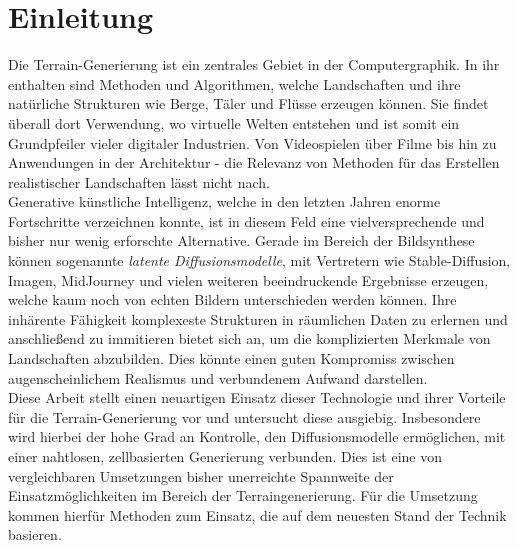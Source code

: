 \chapter{Einleitung}



Die Terrain-Generierung ist ein zentrales Gebiet in der Computergraphik. In ihr enthalten sind Methoden und Algorithmen, welche Landschaften und ihre natürliche Strukturen wie Berge, Täler und Flüsse erzeugen können. Sie findet überall dort Verwendung, wo virtuelle Welten entstehen und ist somit ein Grundpfeiler vieler digitaler Industrien. Von Videospielen über Filme bis hin zu Anwendungen in der Architektur - die Relevanz von Methoden für das Erstellen realistischer Landschaften lässt nicht nach. \\
Generative künstliche Intelligenz, welche in den letzten Jahren enorme Fortschritte verzeichnen konnte, ist in diesem Feld eine vielversprechende und bisher nur wenig erforschte Alternative. Gerade im Bereich der Bildsynthese können sogenannte \textit{latente Diffusionsmodelle}, mit Vertretern wie Stable-Diffusion, Imagen, MidJourney und vielen weiteren beeindruckende Ergebnisse erzeugen, welche kaum noch von echten Bildern unterschieden werden können.
Ihre inhärente Fähigkeit komplexeste Strukturen in räumlichen Daten zu erlernen und anschließend zu immitieren bietet sich an, um die komplizierten Merkmale von Landschaften abzubilden. Dies könnte einen guten Kompromiss zwischen augenscheinlichem Realismus und verbundenem Aufwand darstellen. \\
Diese Arbeit stellt einen neuartigen Einsatz dieser Technologie und ihrer Vorteile für die Terrain-Generierung vor und untersucht diese ausgiebig. Insbesondere wird hierbei der hohe Grad an Kontrolle, den Diffusionsmodelle ermöglichen, mit einer nahtlosen, zellbasierten Generierung verbunden. Dies ist eine von vergleichbaren Umsetzungen bisher unerreichte Spannweite der Einsatzmöglichkeiten im Bereich der Terraingenerierung. Für die Umsetzung kommen hierfür Methoden zum Einsatz, die auf dem neuesten Stand der Technik basieren.
 
